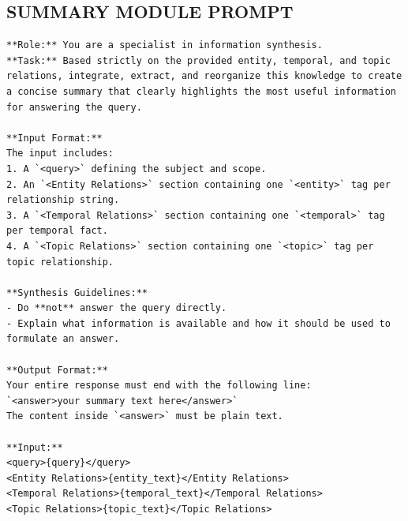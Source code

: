 \subsection{SUMMARY MODULE PROMPT}
\begin{center}
\begin{tcolorbox}[title={SUMMARY MODULE PROMPT (Low)}]
\begin{Verbatim}[breaklines, breakanywhere,fontfamily=tt, fontseries=b, baselinestretch=0.95]
**Role:** You are a specialist in information synthesis.
**Task:** Based strictly on the provided entity, temporal, and topic relations, integrate, extract, and reorganize this knowledge to create a concise summary that clearly highlights the most useful information for answering the query.

**Input Format:**
The input includes:
1. A `<query>` defining the subject and scope.
2. An `<Entity Relations>` section containing one `<entity>` tag per relationship string.
3. A `<Temporal Relations>` section containing one `<temporal>` tag per temporal fact.
4. A `<Topic Relations>` section containing one `<topic>` tag per topic relationship.

**Synthesis Guidelines:**
- Do **not** answer the query directly.
- Explain what information is available and how it should be used to formulate an answer.

**Output Format:**
Your entire response must end with the following line:
`<answer>your summary text here</answer>`
The content inside `<answer>` must be plain text.

**Input:**
<query>{query}</query>
<Entity Relations>{entity_text}</Entity Relations>
<Temporal Relations>{temporal_text}</Temporal Relations>
<Topic Relations>{topic_text}</Topic Relations>
\end{Verbatim}
\end{tcolorbox}
\end{center}


